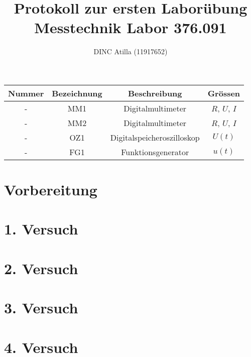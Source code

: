 \documentclass[a4paper]{article}
\title{Protokoll zur ersten Laborübung\\Messtechnik Labor 376.091}
\author{DINC Atilla (11917652)}
\begin{document}
\normalsize
\maketitle
\tableofcontents
\begin{center}
\begin{tabular}{|c| c| c| c|}
    Nummer  & Bezeichnung  & Beschreibung                 & Grössen \\ 
    \hline
    -       & MM1          & Digitalmultimeter            & $R$, $U$, $I$ \\
    -       & MM2          & Digitalmultimeter            &  $R$, $U$, $I$ \\
    -       & OZ1          & Digitalspeicheroszilloskop   & $U(t)$ \\
    -       & FG1          & Funktionsgenerator           & $u(t)$
\end{tabular}
\end{center}
\newpage


\section{Vorbereitung}

\section{1. Versuch}
\section{2. Versuch}
\section{3. Versuch}
\section{4. Versuch}
\end{document}
